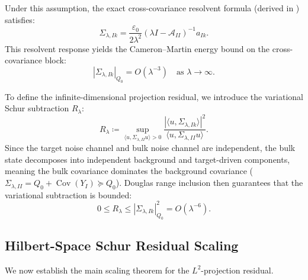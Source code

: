 \documentclass[11pt]{amsart}
\theoremstyle{plain}
\theoremstyle{definition}
\theoremstyle{remark}
\begin{document}
    Under this assumption, the exact cross-covariance resolvent formula (derived in ) satisfies:
    \begin{equation}
        \Sigma_{\lambda,Ik} = \frac{\varepsilon_0}{2\lambda^2} (\lambda I - \mathcal{A}_{II})^{-1} a_{Ik}.
    \end{equation}
    This resolvent response yields the Cameron--Martin energy bound on the cross-covariance block:
    \begin{equation}
        \label{eq:cross_energy_bound}
        |\Sigma_{\lambda,Ik}|_{Q_0} = O(\lambda^{-3}) \quad \text{as } \lambda \to \infty.
    \end{equation}

    To define the infinite-dimensional projection residual, we introduce the variational Schur subtraction $R_\lambda$:
    \begin{equation}
        \label{eq:variational_schur_subtraction}
        R_\lambda \coloneqq \sup_{\langle u, \Sigma_{\lambda,II} u \rangle > 0} \frac{|\langle u, \Sigma_{\lambda,Ik} \rangle|^2}{\langle u, \Sigma_{\lambda,II} u \rangle}.
    \end{equation}
    Since the target noise channel and bulk noise channel are independent, the bulk state decomposes into independent background and target-driven components, meaning the bulk covariance dominates the background covariance ($\Sigma_{\lambda,II} = Q_0 + \operatorname{Cov}(Y_I) \succeq Q_0$). Douglas range inclusion then guarantees that the variational subtraction is bounded:
    \begin{equation}
        0 \le R_\lambda \le |\Sigma_{\lambda,Ik}|_{Q_0}^2 = O(\lambda^{-6}).
    \end{equation}

    \subsection{Hilbert-Space Schur Residual Scaling}
    \label{sec:infdim:scaling}

    We now establish the main scaling theorem for the $L^2$-projection residual.
\end{document}
